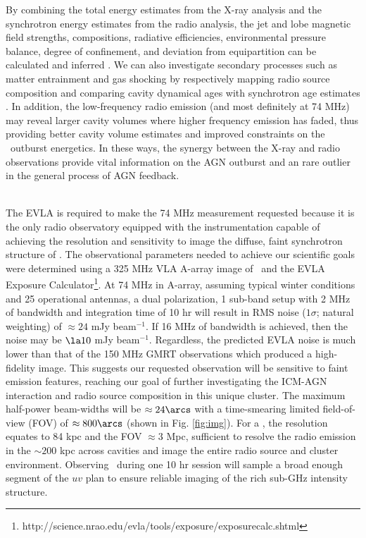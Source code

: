 \documentclass[11pt]{article}
\begin{document}
By combining the total energy estimates from the X-ray analysis and
the synchrotron energy estimates from the radio analysis, the jet and
lobe magnetic field strengths, compositions, radiative efficiencies,
environmental pressure balance, degree of confinement, and deviation
from equipartition can be calculated and inferred
\cite[\eg][]{2003MNRAS.342..399G, 2004AJ....127...48L,
  2005MNRAS.364.1343D, 2006MNRAS.372.1741D, 2006ApJ...648..200D,
  birzan08, pjet}. We can also investigate secondary processes such as
matter entrainment and gas shocking by respectively mapping radio
source composition and comparing cavity dynamical ages with
synchrotron age estimates \cite[\eg][]{2006ApJ...644L...9W,
  birzan08}. In addition, the low-frequency radio emission (and most
definitely at 74 MHz) may reveal larger cavity volumes where higher
frequency emission has faded, thus providing better cavity volume
estimates and improved constraints on the \ms\ outburst energetics. In
these ways, the synergy between the X-ray and radio observations
provide vital information on the AGN outburst and an rare outlier in
the general process of AGN feedback.

\\

The EVLA is required to make the 74 MHz measurement requested because
it is the only radio observatory equipped with the instrumentation
capable of achieving the resolution and sensitivity to image the
diffuse, faint synchrotron structure of \ms. The observational
parameters needed to achieve our scientific goals were determined
using a 325 MHz VLA A-array image of \ms\ and the EVLA Exposure
Calculator\footnote{http://science.nrao.edu/evla/tools/exposure/exposurecalc.shtml}. At
74 MHz in A-array, assuming typical winter conditions and 25
operational antennas, a dual polarization, 1 sub-band setup with 2 MHz
of bandwidth and integration time of 10 hr will result in RMS noise
($1\sigma$; natural weighting) of $\approx 24$ mJy beam$^{-1}$. If 16
MHz of bandwidth is achieved, then the noise may be $\la 10$ mJy
beam$^{-1}$. Regardless, the predicted EVLA noise is much lower than
that of the 150 MHz GMRT observations which produced a high-fidelity
image. This suggests our requested observation will be sensitive to
faint emission features, reaching our goal of further investigating
the ICM-AGN interaction and radio source composition in this unique
cluster. The maximum half-power beam-widths will be $\approx 24\arcs$
with a time-smearing limited field-of-view (FOV) of $\approx 800\arcs$
(shown in Fig. \ref{fig:img}). For a \cosmo, the resolution equates to
84 kpc and the FOV $\approx 3$ Mpc, sufficient to resolve the radio
emission in the $\sim 200$ kpc across cavities and image the entire
radio source and cluster environment. Observing \ms\ during one 10 hr
session will sample a broad enough segment of the $uv$ plan to ensure
reliable imaging of the rich sub-GHz intensity structure.\\
\end{document}
